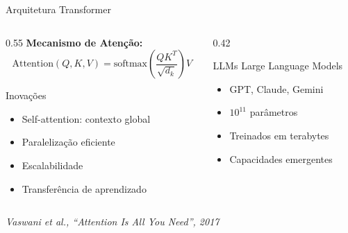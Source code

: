 \documentclass[aspectratio=169,12pt]{beamer}
\begin{document}
\begin{frame}{Arquitetura Transformer}
    \begin{columns}[T]
        \begin{column}{0.55\textwidth}
            \textbf{Mecanismo de Atenção:}
            \begin{equation*}
                \text{Attention}(Q, K, V) = \text{softmax}\left(\frac{QK^T}{\sqrt{d_k}}\right)V
            \end{equation*}

            \begin{block}{Inovações}
                \begin{itemize}
                    \item Self-attention: contexto global
                    \item Paralelização eficiente
                    \item Escalabilidade
                    \item Transferência de aprendizado
                \end{itemize}
            \end{block}
        \end{column}
        \begin{column}{0.42\textwidth}
            \begin{alertblock}{LLMs}
                Large Language Models
                \begin{itemize}
                    \item GPT, Claude, Gemini
                    \item $10^{11}$ parâmetros
                    \item Treinados em terabytes
                    \item Capacidades emergentes
                \end{itemize}
            \end{alertblock}
        \end{column}
    \end{columns}

    \vspace{0.3cm}
    \begin{center}
        \textit{Vaswani et al., ``Attention Is All You Need'', 2017}
    \end{center}
\end{frame}
\end{document}
